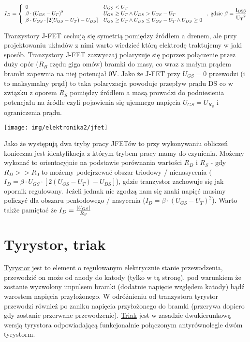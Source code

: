 \documentclass{pdfBooklets}
\begin{document}
$$I_D = \left\{\begin{array}{ll}
	0
		&  U_{GS} < U_T\\
	\beta \cdot (U_{GS}-U_T)^2
		&  U_{GS} \geq U_T \wedge U_{DS} > U_{GS} - U_T\\
	\beta \cdot U_{GS} \cdot [2(U_{GS}-U_T) - U_{DS}]
		&  U_{GS} \geq U_T \wedge U_{DS} \leq  U_{GS} - U_T \wedge U_{DS} \geq 0
\end{array}\right. \rm{,\ gdzie\ } \beta = {I_{DSS} \over {U_T}^2}$$

Tranzystory J-FET cechują się symetrią pomiędzy źródłem a drenem, ale przy projektowaniu układów z nimi warto wiedzieć którą elektrodę traktujemy w jaki sposób.
Tranzystory J-FET zazwyczaj polaryzuje się poprzez połączenie przez duży opór ($R_B$ rzędu giga omów) bramki do masy, co wraz z małym prądem bramki zapewnia na niej potencjał 0V.
Jako że J-FET przy $U_{GS} = 0$ przewodzi (i to maksymalny prąd) to taka polaryzacja powoduje przepływ prądu DS co w związku z oporem $R_S$ pomiędzy źródłem a masą prowadzi do podniesienia potencjału na źródle czyli pojawienia się ujemnego napięcia $U_{GS} = U_{R_S}$ i ograniczenia prądu.

\begin{center}\texttt{[image: img/elektronika2/jfet]}\end{center}

Jako że występują dwa tryby pracy JFETów to przy wykonywaniu obliczeń konieczna jest identyfikacja z którym trybem pracy mamy do czynienia.
Możemy wykonać to orientacyjnie na podstawie porównania wartości $R_D$ i $R_S$ - gdy $R_D >> R_0$ to możemy podejrzewać obszar triodowy / nienasycenia ($I_D = \beta \cdot U_{GS} \cdot [2(U_{GS}-U_T) - U_{DS}]$), gdzie tranzystor zachowuje się jak opornik regulowany.
Jeżeli jednak nie zgodzą nam się znaki napięć musimy policzyć dla obszaru pentodowego / nasycenia ($I_D = \beta \cdot (U_{GS}-U_T)^2$). Warto także pamiętać że $I_D = {|U_{GS}| \over R_S}$

\section{Tyrystor, triak}
\href{https://pl.wikipedia.org/wiki/Tyrystor}{Tyrystor} jest to element o regulowanym elektrycznie stanie przewodzenia, przewodzić on może od anody do katody (tylko w tą stronę), pod warunkiem że zostanie wyzwolony impulsem bramki (dodatnie napięcie względem katody) bądź wzrostem napięcia przyłożonego.
W odróżnieniu od tranzystora tyrystor przewodzi również po zaniku napięcia przyłożonego do bramki (przerywa dopiero gdy zostanie przerwane przewodzenie).
\href{https://pl.wikipedia.org/wiki/Triak}{Triak} jest w zasadzie dwukierunkową wersją tyrystora odpowiadającą funkcjonalnie połączonym antyrównolegle dwóm tyrystorm.
\end{document}
